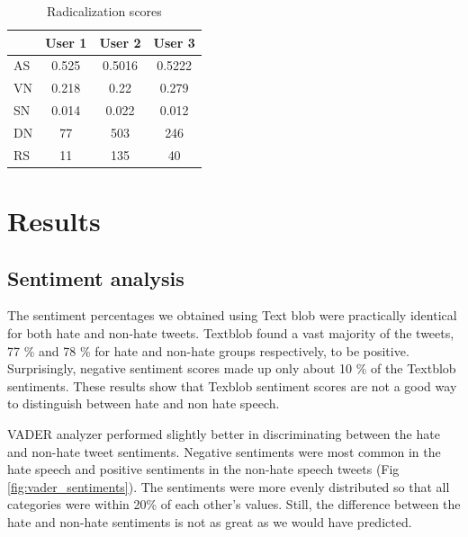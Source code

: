 \documentclass[conference]{IEEEtran}
\begin{document}
\begin{table}[!ht]
  \def\arraystretch{1.2}%
  \begin{center}
  \caption{Radicalization scores}

  \label{tab:radicalization_scores}
  \begin{tabular}{l | c c c}
    \hline\hline
    & User 1 & User 2 & User 3\\
    \hline
    AS & 0.525 & 0.5016 & 0.5222\\
    VN & 0.218 & 0.22 & 0.279\\
    SN & 0.014 & 0.022 & 0.012\\
    DN & 77 & 503 & 246\\
    \hline
    RS & 11 & 135 & 40\\
    \hline\hline
    
  \end{tabular}
\end{center}
\end{table}

\section{Results}

\subsection{Sentiment analysis}
The sentiment percentages we obtained using Text blob were practically identical for both 
hate and non-hate tweets. Textblob found a vast majority of the tweets, 77 \% and 78 \%
for hate and non-hate groups respectively, to be positive. Surprisingly, negative sentiment 
scores made up only about 10 \% of the Textblob sentiments. These results show that Texblob 
sentiment scores are not a good way to distinguish between hate and non hate speech.

VADER analyzer performed slightly better in discriminating between the hate and non-hate tweet sentiments.
Negative sentiments were most common in the hate speech and positive sentiments in the non-hate 
speech tweets (Fig \ref{fig:vader_sentiments}). The sentiments were more evenly distributed so that all categories were within 20\% of 
each other’s values. Still, the difference between the hate and non-hate sentiments is not 
as great as we would have predicted.
\end{document}
